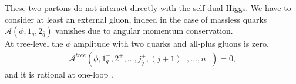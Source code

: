These two partons do not interact directly with the self-dual Higgs. We have to consider at least an external gluon, indeed in the case of massless quarks $\mathcal{A}(\phi, 1_q, 2_{\bar q})$ vanishes due to angular momentum conservation.\\
At tree-level the $\phi$ amplitude with two quarks and all-plus gluons is zero,
\begin{align*}
	\mathcal{A}^{tree}(\phi,1_q^-, 2^+, \dots, j_{\bar q}^+,(j+1)^+, \dots, n^+)=0,
\end{align*}
and it is rational at one-loop \cite{Berger:2006sh}.